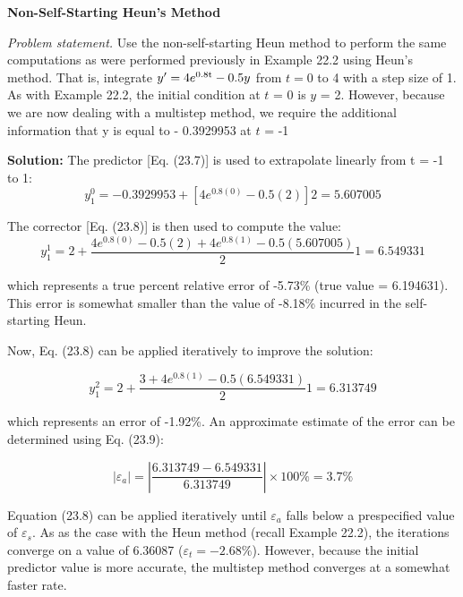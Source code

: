 \documentclass[../main.tex]{subfiles}
\begin{document}
\begin{exmp}
    \textbf{Non-Self-Starting Heun's Method}

    \noindent \textit{Problem statement.} Use the non-self-starting Heun method to perform the same computations as were performed previously in Example 22.2 using Heun's method. That is,
    integrate $y' = 4e\textsuperscript{0.8t} - 0.5y$ from $t = 0$ to 4 with a step size of 1. As with Example 22.2,
    the initial condition at $t$ = 0 is $y$ = 2. However, because we are now dealing with a multistep method, we require the additional information that y is equal to - 0.3929953 at $t$ = -1

    \noindent \textbf{Solution: }  The predictor [Eq. (23.7)] is used to extrapolate linearly from t = -1 to 1:
    \begin{equation}
        y_{1}^{0}=-0.3929953+\left[4 e^{0.8(0)}-0.5(2)\right] 2=5.607005 \nonumber
    \end{equation}

    \noindent The corrector [Eq. (23.8)] is then used to compute the value:
    \begin{equation}
        y_{1}^{1}=2+\frac{4 e^{0.8(0)}-0.5(2)+4 e^{0.8(1)}-0.5(5.607005)}{2} 1=6.549331 \nonumber
    \end{equation}

    \noindent which represents a true percent relative error of -5.73\% (true value = 6.194631). This
    error is somewhat smaller than the value of -8.18\% incurred in the self-starting Heun.

    Now, Eq. (23.8) can be applied iteratively to improve the solution:

    \begin{equation}
        y_{1}^{2}=2+\frac{3+4 e^{0.8(1)}-0.5(6.549331)}{2} 1=6.313749 \nonumber
    \end{equation}

    \noindent which represents an error of -1.92\%. An approximate estimate of the error can be determined using Eq. (23.9):

    \begin{equation}
        \left|\varepsilon_{a}\right|=\left|\frac{6.313749-6.549331}{6.313749}\right| \times 100 \%=3.7 \% \nonumber
    \end{equation}

    \noindent Equation (23.8) can be applied iteratively until $\varepsilon_{a}$ falls below a prespecified value of $\varepsilon_{s}$. As as the case with the Heun method (recall Example 22.2), the iterations converge on a
    value of 6.36087 ($\varepsilon_{t} = -2.68\%$). However, because the initial predictor value is more
    accurate, the multistep method converges at a somewhat faster rate.


\end{exmp}
\end{document}
